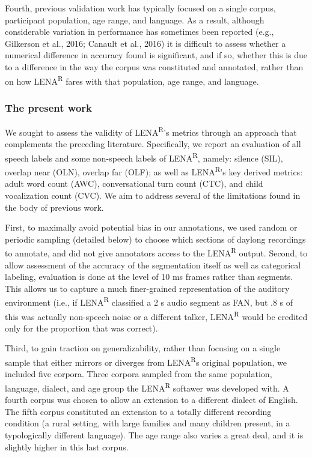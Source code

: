 \documentclass[english,table,man,floatsintext]{apa6}
\begin{document}
Fourth, previous validation work has typically focused on a single corpus, participant population, age range, and language. As a result, although considerable variation in performance has sometimes been reported (e.g., Gilkerson et al., 2016; Canault et al., 2016) it is difficult to assess whether a numerical difference in accuracy found is significant, and if so, whether this is due to a difference in the way the corpus was constituted and annotated, rather than on how LENA\textsuperscript{R} fares with that population, age range, and language.

\hypertarget{the-present-work}{%
\subsubsection{The present work}\label{the-present-work}}

We sought to assess the validity of LENA\textsuperscript{R}'s metrics through an approach that complements the preceding literature. Specifically, we report an evaluation of all speech labels and some non-speech labels of LENA\textsuperscript{R}, namely: silence (SIL), overlap near (OLN), overlap far (OLF); as well as LENA\textsuperscript{R}'s key derived metrics: adult word count (AWC), conversational turn count (CTC), and child vocalization count (CVC). We aim to address several of the limitations found in the body of previous work.

First, to maximally avoid potential bias in our annotations, we used random or periodic sampling (detailed below) to choose which sections of daylong recordings to annotate, and did not give annotators access to the LENA\textsuperscript{R} output. Second, to allow assessment of the accuracy of the segmentation itself as well as categorical labeling, evaluation is done at the level of 10 ms frames rather than segments. This allows us to capture a much finer-grained representation of the auditory environment (i.e., if LENA\textsuperscript{R} classified a 2 s audio segment as FAN, but .8 s of this was actually non-speech noise or a different talker, LENA\textsuperscript{R} would be credited only for the proportion that was correct).

Third, to gain traction on generalizability, rather than focusing on a single sample that either mirrors or diverges from LENA\textsuperscript{R}s original population, we included five corpora. Three corpora sampled from the same population, language, dialect, and age group the LENA\textsuperscript{R} softawer was developed with. A fourth corpus was chosen to allow an extension to a different dialect of English. The fifth corpus constituted an extension to a totally different recording condition (a rural setting, with large families and many children present, in a typologically different language). The age range also varies a great deal, and it is slightly higher in this last corpus.
\end{document}
